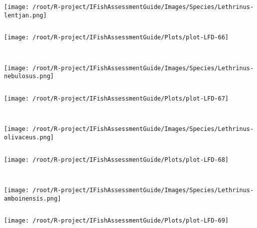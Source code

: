 \documentclass{report}\usepackage[]{graphicx}\usepackage[]{color}
\makeatletter
\def\maxwidth{ %
  \ifdim\Gin@nat@width>\linewidth
    \linewidth
  \else
    \Gin@nat@width
  \fi
}
\newenvironment{kframe}{%
 \def\at@end@of@kframe{}%
 \ifinner\ifhmode%
  \def\at@end@of@kframe{\end{minipage}}%
  \begin{minipage}{\columnwidth}%
 \fi\fi%
 \def\FrameCommand##1{\hskip\@totalleftmargin \hskip-\fboxsep
 \colorbox{shadecolor}{##1}\hskip-\fboxsep
     \hskip-\linewidth \hskip-\@totalleftmargin \hskip\columnwidth}%
 \MakeFramed {\advance\hsize-\width
   \@totalleftmargin\z@ \linewidth\hsize
   \@setminipage}}%
 {\par\unskip\endMakeFramed%
 \at@end@of@kframe}
\newenvironment{knitrout}{}{} %
\makeatother
\begin{document}
\begin{knitrout}
\begin{kframe}
\begin{verbatim}
\end{verbatim}
\end{kframe}
\texttt{[image: /root/R-project/IFishAssessmentGuide/Images/Species/Lethrinus-lentjan.png]}
\begin{kframe}\begin{verbatim}
\end{verbatim}
\end{kframe}
\texttt{[image: /root/R-project/IFishAssessmentGuide/Plots/plot-LFD-66]} 
\begin{kframe}\begin{verbatim}
 
\end{verbatim}
\end{kframe}
\texttt{[image: /root/R-project/IFishAssessmentGuide/Images/Species/Lethrinus-nebulosus.png]}
\begin{kframe}\begin{verbatim}
\end{verbatim}
\end{kframe}
\texttt{[image: /root/R-project/IFishAssessmentGuide/Plots/plot-LFD-67]} 
\begin{kframe}\begin{verbatim}
 
\end{verbatim}
\end{kframe}
\texttt{[image: /root/R-project/IFishAssessmentGuide/Images/Species/Lethrinus-olivaceus.png]}
\begin{kframe}\begin{verbatim}
\end{verbatim}
\end{kframe}
\texttt{[image: /root/R-project/IFishAssessmentGuide/Plots/plot-LFD-68]} 
\begin{kframe}\begin{verbatim}
 
\end{verbatim}
\end{kframe}
\texttt{[image: /root/R-project/IFishAssessmentGuide/Images/Species/Lethrinus-amboinensis.png]}
\begin{kframe}\begin{verbatim}
\end{verbatim}
\end{kframe}
\texttt{[image: /root/R-project/IFishAssessmentGuide/Plots/plot-LFD-69]} 
\begin{kframe}\begin{verbatim}
 

\end{verbatim}
\end{kframe}
\end{knitrout}
\end{document}
